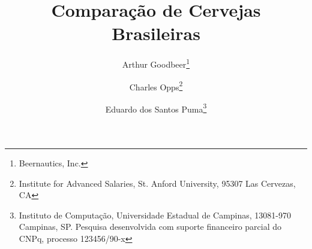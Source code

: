 \documentclass[11pt,twoside]{article}
\begin{document}




    \TRMakeCover


    \pagestyle{myheadings}

    \title{Comparação de Cervejas Brasileiras}

    \author{
        Arthur Goodbeer\thanks{Beernautics, Inc.} \and
        Charles Opps\thanks{Institute for Advanced Salaries,
            St. Anford University, 95307 Las Cervezas, CA} \and
        Eduardo dos Santos Puma\thanks{Instituto  de Computação, Universidade
            Estadual  de Campinas, 13081-970  Campinas,  SP.  Pesquisa desenvolvida
            com suporte financeiro parcial do CNPq, processo 123456/90-x}
    }

    \date{}

    \maketitle
\end{document}
